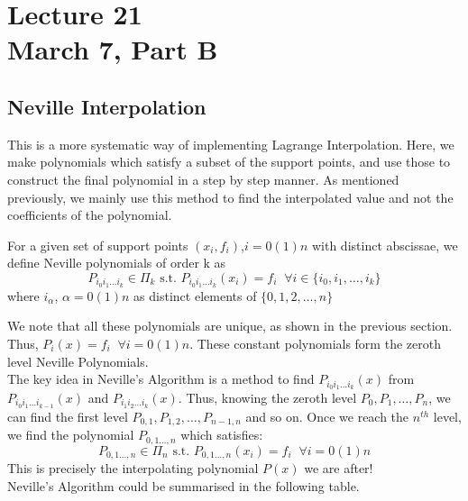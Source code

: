 \chapter*{Lecture 21\\March 7, Part B}
\setcounter{chapter}{21}

\section{Neville Interpolation}
This is a more systematic way of implementing Lagrange Interpolation. Here, we make polynomials which satisfy a subset of the support points, and use those to construct the final polynomial in a step by step manner. As mentioned previously, we mainly use this method to find the interpolated value and not the coefficients of the polynomial.\\

\begin{defn}
	For a given set of support points $(x_i,f_i)$,$i = 0(1)n$ with distinct abscissae, we define Neville polynomials of order k as
	$$P_{i_0i_1\dots i_k} \in \Pi_k \text{    s.t.    } P_{i_0i_1\dots i_k}(x_i) = f_i\;\;\forall i \in \{i_0,i_1,\dots,i_k\}$$
	where $i_\alpha$, $\alpha = 0(1)n $ as distinct elements of $\{0,1,2,\dots,n\}$
\end{defn}

We note that all these polynomials are unique, as shown in the previous section.\\
Thus, $P_{i}(x) = f_{i}\;\;\forall i = 0(1)n$. These constant polynomials form the zeroth level  Neville Polynomials.\\
The key idea in Neville's Algorithm is a method to find $P_{i_0i_1\dots i_k}(x)$ from $P_{i_0i_1\dots i_{k-1}}(x)$ and $P_{i_1i_2\dots i_k}(x)$. Thus, knowing the zeroth level $P_0, P_1,\dots, P_n$, we can find the first level $P_{0,1}, P_{1,2},\dots, P_{n-1,n}$ and so on. Once we reach the $n^{th}$ level, we find the polynomial $P_{0,1\dots, n}$ which satisfies:
$$P_{0,1\dots, n} \in \Pi_n \text{    s.t.    } P_{0,1\dots, n}(x_i) = f_i\;\;\forall i = 0(1)n $$
This is precisely the interpolating polynomial $P(x)$ we are after!\\[0.2 cm]
Neville's Algorithm could be summarised in the following table.\\[0.2 cm]


